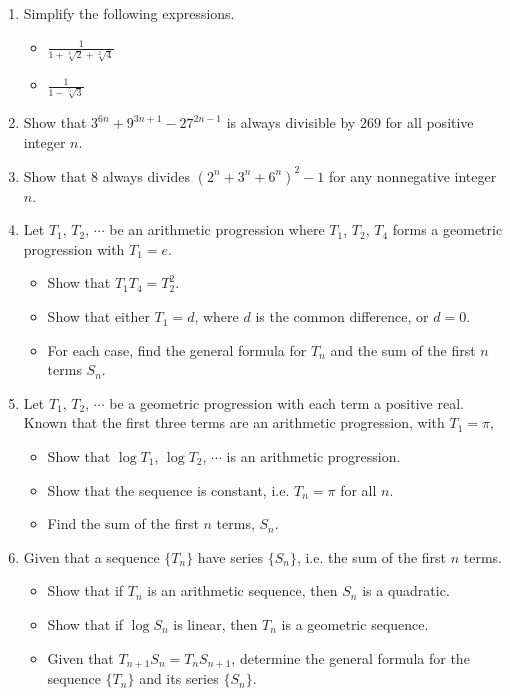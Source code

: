 \documentclass{article}
\begin{document}
\begin{enumerate}
\item Simplify the following expressions.
\begin{itemize}
              \item[(a)] $\displaystyle\frac{1}{1+\sqrt[3]{2}+\sqrt[2]{4}}$
              \item[(b)] $\displaystyle\frac{1}{1-\sqrt[5]{3}}$
       \end{itemize}
\item Show that $3^{6n}+9^{3n+1}-27^{2n-1}$ is always divisible by $269$ for all positive integer $n$.
\item Show that $8$ always divides $(2^n+3^n+6^n)^2-1$ for any nonnegative integer $n$.
\item Let $T_1$, $T_2$, $\cdots$ be an arithmetic progression where $T_1$, $T_2$, $T_4$ forms a geometric progression with $T_1=e$.
       \begin{itemize}
              \item[(a)] Show that $T_1T_4=T_2^2$.
              \item[(b)] Show that either $T_1=d$, where $d$ is the common difference, or $d=0$.
              \item[(c)] For each case, find the general formula for $T_n$ and the sum of the first $n$ terms $S_n$.
       \end{itemize}
\item Let $T_1$, $T_2$, $\cdots$ be a geometric progression with each term a positive real. Known that the first three terms are an arithmetic progression, with $T_1=\pi$,
       \begin{itemize}
              \item[(a)] Show that $\log T_1$, $\log T_2$, $\cdots$ is an arithmetic progression.
              \item[(b)] Show that the sequence is constant, i.e. $T_n=\pi$ for all $n$.
              \item[(c)] Find the sum of the first $n$ terms, $S_n$.
       \end{itemize}
\item Given that a sequence $\{T_n\}$ have series $\{S_n\}$, i.e. the sum of the first $n$ terms.
       \begin{itemize}
              \item[(a)] Show that if $T_n$ is an arithmetic sequence, then $S_n$ is a quadratic.
              \item[(b)] Show that if $\log S_n$ is linear, then $T_n$ is a geometric sequence.
              \item[(c)] Given that $T_{n+1}S_n=T_nS_{n+1}$, determine the general formula for the sequence $\{T_n\}$ and its series $\{S_n\}$.

\end{itemize}
\end{enumerate}
\end{document}
